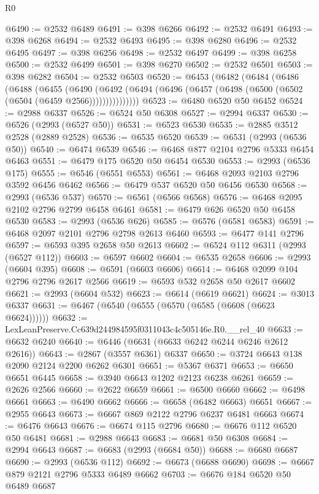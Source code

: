 \begin{lexlean}{R0}
\begin{coremodule}
@6490 := @2532 @6489
@6491 := @398 @6266
@6492 := @2532 @6491
@6493 := @398 @6268
@6494 := @2532 @6493
@6495 := @398 @6280
@6496 := @2532 @6495
@6497 := @398 @6256
@6498 := @2532 @6497
@6499 := @398 @6258
@6500 := @2532 @6499
@6501 := @398 @6270
@6502 := @2532 @6501
@6503 := @398 @6282
@6504 := @2532 @6503
@6520 := @6453
    (@6482
      (@6484
        (@6486
          (@6488
            (@6455
              (@6490
                (@6492 (@6494 (@6496 (@6457 (@6498 (@6500 (@6502 (@6504 (@6459 @2566)))))))))))))))
@6523 := @6480 @6520 @50 @6452
@6524 := @2988 @6337
@6526 := @6524 @50 @6308
@6527 := @2994 @6337
@6530 := @6526 (@2993 (@6527 @50))
@6531 := @6523 @6530
@6535 := @2885 @3512 @2528 (@2889 @2528)
@6536 := @6535 @6520
@6539 := @6531 (@2993 (@6536 @50))
@6540 := @6474 @6539
@6546 := @6468 @877 @2104 @2796 @5333 @6454 @6463
@6551 := @6479 @175 @6520 @50 @6454 @6530
@6553 := @2993 (@6536 @175)
@6555 := @6546 (@6551 @6553)
@6561 := @6468 @2093 @2103 @2796 @3592 @6456 @6462
@6566 := @6479 @537 @6520 @50 @6456 @6530
@6568 := @2993 (@6536 @537)
@6570 := @6561 (@6566 @6568)
@6576 := @6468 @2095 @2102 @2796 @2799 @6458 @6461
@6581 := @6479 @626 @6520 @50 @6458 @6530
@6583 := @2993 (@6536 @626)
@6585 := @6576 (@6581 @6583)
@6591 := @6468 @2097 @2101 @2796 @2798 @2613 @6460
@6593 := @6477 @141 @2796
@6597 := @6593 @395 @2658 @50 @2613
@6602 := @6524 @112 @6311 (@2993 (@6527 @112))
@6603 := @6597 @6602
@6604 := @6535 @2658
@6606 := @2993 (@6604 @395)
@6608 := @6591 (@6603 @6606)
@6614 := @6468 @2099 @104 @2796 @2796 @2617 @2566
@6619 := @6593 @532 @2658 @50 @2617 @6602
@6621 := @2993 (@6604 @532)
@6623 := @6614 (@6619 @6621)
@6624 := @3013 @6337
@6631 := @6467 (@6540 (@6555 (@6570 (@6585 (@6608 (@6623 @6624))))))
@6632 := LexLeanPreserve.Cc639d244984595f0311043c4c505146e.R0.__rel_40
@6633 := @6632 @6240
@6640 := @6446 (@6631 (@6633 @6242 @6244 @6246 @2612 @2616))
@6643 := @2867 (@3557 @6361) @6337
@6650 := @3724 @6643 @138 @2090 @2124 @2200 @6262 @6301
@6651 := @5367 @6371
@6653 := @6650 @6651 @6445
@6658 := @3940 @6643 @1202 @2123 @6238 @6261
@6659 := @2626 @2566
@6660 := @2622 @6659
@6661 := @6500 @6660
@6662 := @6498 @6661
@6663 := @6490 @6662
@6666 := @6658 (@6482 @6663) @6651
@6667 := @2955 @6643
@6673 := @6667 @869 @2122 @2796 @6237 @6481 @6663
@6674 := @6476 @6643
@6676 := @6674 @115 @2796
@6680 := @6676 @112 @6520 @50 @6481
@6681 := @2988 @6643
@6683 := @6681 @50 @6308
@6684 := @2994 @6643
@6687 := @6683 (@2993 (@6684 @50))
@6688 := @6680 @6687
@6690 := @2993 (@6536 @112)
@6692 := @6673 (@6688 @6690)
@6698 := @6667 @879 @2121 @2796 @5333 @6489 @6662
@6703 := @6676 @184 @6520 @50 @6489 @6687

\end{coremodule}
\end{lexlean}
